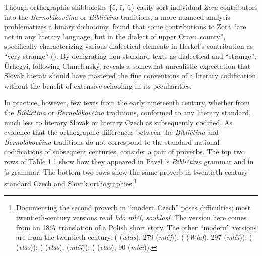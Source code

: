 Though orthographic shibboleths \{ě, ř, ů\} easily sort individual \textit{Zora} contributors into the \textit{Bernolákovčina} or \textit{Bibličtina} traditions, a more nuanced analysis problematizes a binary dichotomy. \citet[222]{urhegyi_almanach_1984} found that some contributions to Zora “are not in any literary language, but in the dialect of upper Orava county”, specifically characterizing various dialectical elements in Herkel’s contribution as “very strange” (\citeyear[222]{urhegyi_almanach_1984}). By denigrating non-standard texts as dialectical and “strange”, Űrhegyi, following Chmelenský, reveals a somewhat unrealistic expectation that Slovak literati should have mastered the fine conventions of a literary codification without the benefit of extensive schooling in its peculiarities.

In practice, however, few texts from the early nineteenth century, whether from the \textit{Bibličtina} or \textit{Bernolákovčina} traditions, conformed to any literary standard, much less to literary Slovak or literary Czech as subsequently codified. As evidence that the orthographic differences between the \textit{Bibličtina} and \textit{Bernolá\-kovčina} traditions do not correspond to the standard national codifications of subsequent centuries, consider a pair of proverbs. The top two rows of \hyperref[tab:Table 1.1]{Table 1.1} show how they appeared in Pavel \citeauthor{dolezal_grammatica_1746}’s \citeyear{dolezal_grammatica_1746} \textit{Bibličtina} grammar and in \citeauthor{bernolak_grammatica_1790}’s \citeyear{bernolak_grammatica_1790} grammar. The bottom two rows show the same proverb in twen\-tieth-century standard Czech and Slovak orthographies.\footnote{Documenting the second proverb in “modern Czech” poses difficulties; most twentieth-century versions read \textit{kdo mlčí, souhlasí}. The version here comes from an 1867 translation of a Polish short story. The other “modern” versions are from the twentieth century. \citeauthor{dolezal_grammatica_1746} (\citeyear[286]{dolezal_grammatica_1746} (\textit{wľas}), 279 (\textit{mlčj})); \citeauthor{bernolak_grammatica_1790} (\citeyear[311]{bernolak_grammatica_1790} (\textit{Wlaſ}), 297 (\textit{mlčí})); \citeauthor{hanusem_clovekoslovi_1867} (\citeyear[167]{hanusem_clovekoslovi_1867} (\textit{vlas})); \citeauthor{flajshans_ceska_1911a} (\citeyear[770]{flajshans_ceska_1911b} (\textit{vlas}), \citeyear[967]{flajshans_ceska_1911a} (\textit{mlčí})); \citeauthor{melichercik_slovenske_1953} (\citeyear[258]{melichercik_slovenske_1953} (\textit{vlas}), 90 (\textit{mlčí})).}

